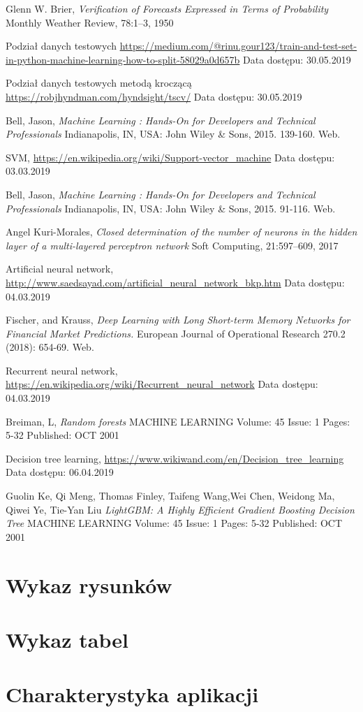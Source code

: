 \documentclass[a4paper, twoside, 11pt, openright]{article}
\begin{document}
\begin{thebibliography}{9}
	Glenn W. Brier, 
  \textit{Verification of Forecasts Expressed in Terms of Probability}
  Monthly Weather Review, 78:1–3, 1950

 Podział danych testowych \url{https://medium.com/@rinu.gour123/train-and-test-set-in-python-machine-learning-how-to-split-58029a0d657b}
 Data dostępu: 30.05.2019
 
 
 Podział danych testowych metodą kroczącą \url{https://robjhyndman.com/hyndsight/tscv/}
 Data dostępu: 30.05.2019
 
	Bell, Jason, \textit{Machine Learning : Hands-On for Developers and Technical Professionals}  Indianapolis, IN, USA: John Wiley \& Sons, 2015. 139-160. Web.
	
	SVM, \url{https://en.wikipedia.org/wiki/Support-vector_machine} 
	Data dostępu: 03.03.2019

	Bell, Jason, \textit{Machine Learning : Hands-On for Developers and Technical Professionals}  Indianapolis, IN, USA: John Wiley \& Sons, 2015. 91-116. Web.


	Angel Kuri-Morales, 
  \textit{Closed determination of the number of neurons in the hidden layer of a multi-layered perceptron network}
  Soft Computing, 21:597–609, 2017

	Artificial neural network, \url{http://www.saedsayad.com/artificial_neural_network_bkp.htm} 
	Data dostępu: 04.03.2019

	Fischer, and Krauss, 
  \textit{Deep Learning with Long Short-term Memory Networks for Financial Market Predictions.}
  European Journal of Operational Research 270.2 (2018): 654-69. Web.

	Recurrent neural network, \url{https://en.wikipedia.org/wiki/Recurrent_neural_network} 
	Data dostępu: 04.03.2019

	Breiman, L, 
  \textit{Random forests}
	MACHINE LEARNING  Volume: 45   Issue: 1   Pages: 5-32   Published: OCT 2001


	Decision tree learning, \url{https://www.wikiwand.com/en/Decision_tree_learning} 
	Data dostępu: 06.04.2019


Guolin Ke, Qi Meng, Thomas Finley, Taifeng Wang,Wei Chen, Weidong Ma, Qiwei Ye, Tie-Yan Liu
  \textit{LightGBM: A Highly Efficient Gradient Boosting Decision Tree}
	MACHINE LEARNING  Volume: 45   Issue: 1   Pages: 5-32   Published: OCT 2001



\end{thebibliography}

\section{Wykaz rysunków}

\section{Wykaz tabel}

\section{Charakterystyka aplikacji}
\end{document}
